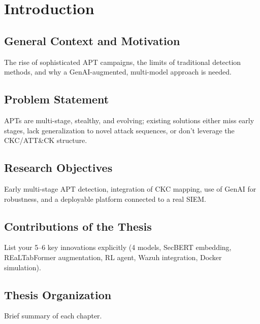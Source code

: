 \chapter{Introduction}
\section{General Context and Motivation}
The rise of sophisticated APT campaigns, the limits of traditional detection methods, and why a GenAI-augmented, multi-model approach is needed.

\section{Problem Statement}
APTs are multi-stage, stealthy, and evolving; existing solutions either miss early stages, lack generalization to novel attack sequences, or don't leverage the CKC/ATT\&CK structure.

\section{Research Objectives}
Early multi-stage APT detection, integration of CKC mapping, use of GenAI for robustness, and a deployable platform connected to a real SIEM.

\section{Contributions of the Thesis}
List your 5--6 key innovations explicitly (4 models, SecBERT embedding, REaLTabFormer augmentation, RL agent, Wazuh integration, Docker simulation).

\section{Thesis Organization}
Brief summary of each chapter.
